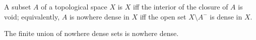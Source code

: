 \begin{definition}
A subset $A$ of a topological space $X$ is  $X$ iff the interior of the closure of $A$ is void; equivalently, $A$ is nowhere dense in $X$ iff the open set $X \setminus A^{-}$ is dense in $X$.
\end{definition}

\begin{proposition}
The finite union of nowhere dense sets is nowhere dense.
\end{proposition}
